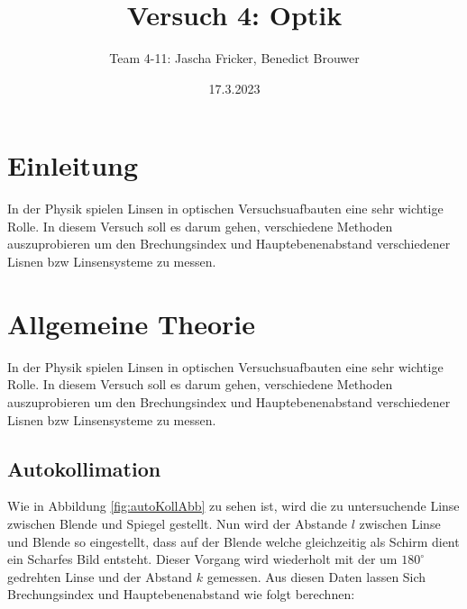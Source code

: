 \documentclass[11pt, a4paper]{article}
\title{Versuch 4: Optik}
\author{Team 4-11: Jascha Fricker, Benedict Brouwer}
\date{17.3.2023}
\begin{document}
    \def\Dimline[#1][#2][#3]{
        \begin{scope}[>=latex] %
            \draw let \p1=#1, \p2=#2, \n0={veclen(\x2-\x1,\y2-\y1)} in [|<->|,
            decoration={markings, %
                    mark=at position 0.5 with {\node[#3] at (0,0) {\DimScale{\n0}};},
            },
            postaction=decorate] #1 -- #2 ;
        \end{scope}
    }

    \def\DimScale#1{\pgfmathparse{round(#1/28.4*10.0)/10.0}\pgfmathresult cm}

    \maketitle

    \tableofcontents

    \newpage

    \section{Einleitung}
    In der Physik spielen Linsen in optischen Versuchsuafbauten eine sehr wichtige Rolle. In diesem Versuch soll es darum gehen, verschiedene 
    Methoden auszuprobieren um den Brechungsindex und Hauptebenenabstand verschiedener Lisnen bzw Linsensysteme zu messen.

    \section{Allgemeine Theorie}
    \FloatBarrier
    In der Physik spielen Linsen in optischen Versuchsuafbauten eine sehr wichtige Rolle. In diesem Versuch soll es darum gehen, verschiedene 
    Methoden auszuprobieren um den Brechungsindex und Hauptebenenabstand verschiedener Lisnen bzw Linsensysteme zu messen.
    \subsection{Autokollimation}
    Wie in Abbildung \ref{fig:autoKollAbb} zu sehen ist, wird die zu untersuchende Linse zwischen Blende und Spiegel gestellt. Nun wird der Abstande $l$ zwischen 
    Linse und Blende so eingestellt, dass auf der Blende welche gleichzeitig als Schirm dient ein Scharfes Bild entsteht. Dieser Vorgang wird wiederholt mit der um $180^\circ$ gedrehten Linse und der Abstand $k$ gemessen.
    Aus diesen Daten lassen Sich Brechungsindex und Hauptebenenabstand wie folgt berechnen:
\end{document}
